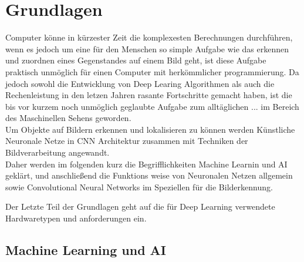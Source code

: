 \chapter{Grundlagen}\label{kap:grundlagen}


Computer könne in kürzester Zeit die komplexesten Berechnungen 
durchführen, wenn es jedoch um eine für den Menschen so 
simple Aufgabe wie das erkennen und zuordnen eines Gegenstandes
auf einem Bild geht, ist diese Aufgabe praktisch 
unmöglich für einen Computer mit herkömmlicher programmierung. 
Da jedoch sowohl die Entwicklung von Deep Learing Algorithmen 
als auch die Rechenleistung in den letzen Jahren rasante 
Fortschritte gemacht haben, ist die bis vor kurzem 
noch unmöglich geglaubte Aufgabe zum alltäglichen ... 
im Bereich des Maschinellen Sehens geworden.\\

Um Objekte auf Bildern erkennen und lokalisieren zu können 
werden Künstliche Neuronale Netze in CNN Architektur 
zusammen mit Techniken der Bildverarbeitung angewandt.\\

Daher werden im folgenden kurz die Begrifflichkeiten Machine 
Learnin und AI geklärt, und anschließend die Funktions
weise von Neuronalen Netzen allgemein sowie Convolutional 
Neural Networks im Speziellen für die Bilderkennung.

Der Letzte Teil der Grundlagen geht auf die für Deep 
Learning verwendete Hardwaretypen und anforderungen ein.




\section{Machine Learning und AI}\label{sec:ml}


